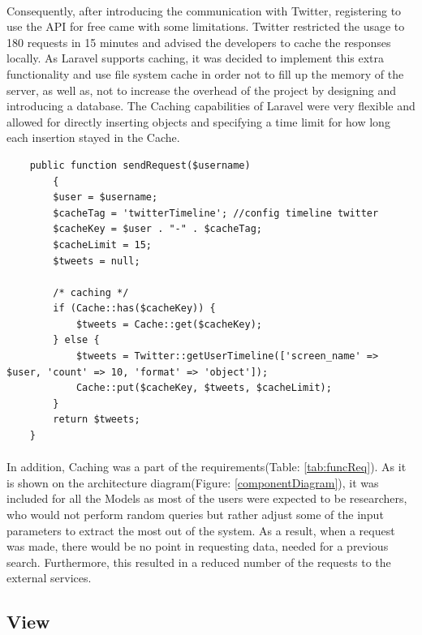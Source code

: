 \documentclass{l4proj}
\begin{document}
\paragraph{}
Consequently, after introducing the communication with Twitter, registering to use the API for free came with some limitations. Twitter restricted the usage to 180 requests in 15 minutes and advised the developers to cache the responses locally. As Laravel supports caching, it was decided to implement this extra functionality and use file system cache in order not to fill up the memory of the server, as well as, not to increase the overhead of the project by designing and introducing a database. The Caching capabilities of Laravel were very flexible and allowed for directly inserting objects and specifying a time limit for how long each insertion stayed in the Cache. 
\begin{lstlisting}
    public function sendRequest($username)
	    {
	    $user = $username;
	    $cacheTag = 'twitterTimeline'; //config timeline twitter
	    $cacheKey = $user . "-" . $cacheTag;
	    $cacheLimit = 15;
	    $tweets = null;
	    
	    /* caching */
	    if (Cache::has($cacheKey)) {
		    $tweets = Cache::get($cacheKey);
	    } else {
		    $tweets = Twitter::getUserTimeline(['screen_name' => $user, 'count' => 10, 'format' => 'object']);
		    Cache::put($cacheKey, $tweets, $cacheLimit);
	    }
	    return $tweets;
    }
\end{lstlisting}
\paragraph{}
In addition, Caching was a part of the requirements(Table: \ref{tab:funcReq}). As it is shown on the architecture diagram(Figure: \ref{componentDiagram}), it was included for all the Models as most of the users were expected to be researchers, who would not perform random queries but rather adjust some of the input parameters to extract the most out of the system. As a result, when a request was made, there would be no point in requesting data, needed for a previous search. Furthermore, this resulted in a reduced number of the requests to the external services. 


\subsection{View}
\label{sub:view}
\end{document}
